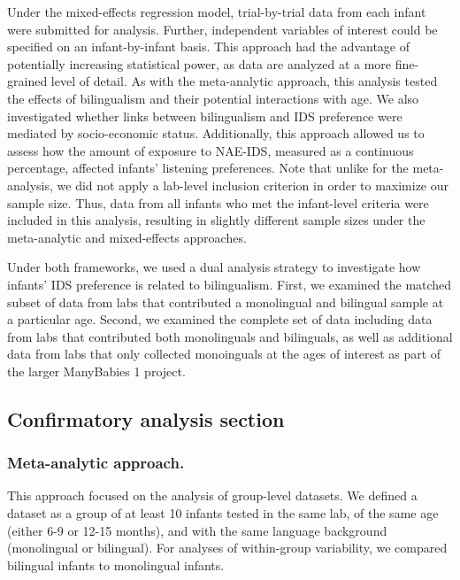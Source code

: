 \documentclass[,man,floatsintext]{apa6}
\begin{document}
Under the mixed-effects regression model, trial-by-trial data from each infant were submitted for analysis. Further, independent variables of interest could be specified on an infant-by-infant basis. This approach had the advantage of potentially increasing statistical power, as data are analyzed at a more fine-grained level of detail. As with the meta-analytic approach, this analysis tested the effects of bilingualism and their potential interactions with age. We also investigated whether links between bilingualism and IDS preference were mediated by socio-economic status. Additionally, this approach allowed us to assess how the amount of exposure to NAE-IDS, measured as a continuous percentage, affected infants' listening preferences. Note that unlike for the meta-analysis, we did not apply a lab-level inclusion criterion in order to maximize our sample size. Thus, data from all infants who met the infant-level criteria were included in this analysis, resulting in slightly different sample sizes under the meta-analytic and mixed-effects approaches.

Under both frameworks, we used a dual analysis strategy to investigate how infants' IDS preference is related to bilingualism. First, we examined the matched subset of data from labs that contributed a monolingual and bilingual sample at a particular age. Second, we examined the complete set of data including data from labs that contributed both monolinguals and bilinguals, as well as additional data from labs that only collected monoinguals at the ages of interest as part of the larger ManyBabies 1 project.

\hypertarget{confirmatory-analysis-section}{%
\subsection{Confirmatory analysis section}\label{confirmatory-analysis-section}}

\hypertarget{meta-analytic-approach.}{%
\subsubsection{Meta-analytic approach.}\label{meta-analytic-approach.}}

This approach focused on the analysis of group-level datasets. We defined a dataset as a group of at least 10 infants tested in the same lab, of the same age (either 6-9 or 12-15 months), and with the same language background (monolingual or bilingual). For analyses of within-group variability, we compared bilingual infants to monolingual infants.
\end{document}
